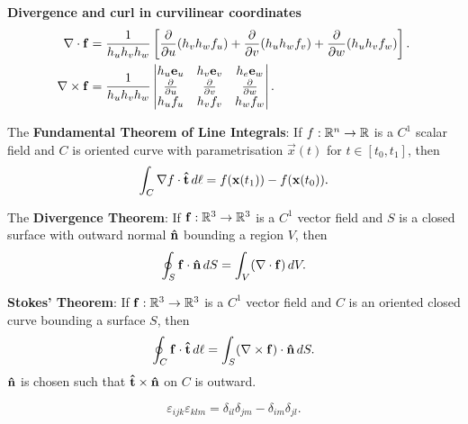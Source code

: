\documentclass[10pt, a4paper]{article}
\begin{document}
\textbf{Divergence and curl in curvilinear coordinates}
\begin{align*}
    \mathbf{\nabla} \cdot \mathbf{f} &= \frac{1}{h_uh_vh_w}\left[\frac{\partial }{\partial u}(h_vh_wf_u) + \frac{\partial }{\partial v}(h_uh_wf_v) + \frac{\partial }{\partial w}(h_uh_vf_w)\right]. \\
    \mathbf{\nabla} \times \mathbf{f} &= \frac{1}{h_uh_vh_w}\begin{vmatrix}
        h_u\mathbf{e}_u & h_v\mathbf{e}_v & h_e\mathbf{e}_w \\
        \frac{\partial }{\partial u} & \frac{\partial }{\partial v} & \frac{\partial }{\partial w} \\
        h_uf_u & h_vf_v & h_wf_w
    \end{vmatrix}.
\end{align*}

The \textbf{Fundamental Theorem of Line Integrals}:
If $f : \mathbb{R} ^ n \to \mathbb{R}$ is a $C ^ 1$ scalar field and $C$ is oriented curve with parametrisation $\vec{x}(t)$ for $t \in [t_0, t_1]$,
then
\[
\int_{C}\mathbf{\nabla} f\cdot\mathbf{\hat{t}}\,d\ell = f(\mathbf{x}(t_1)) - f(\mathbf{x}(t_0)).
\]

The \textbf{Divergence Theorem}:
If $\mathbf{f} : \mathbb{R} ^ 3 \to \mathbb{R} ^ 3$ is a $C ^ 1$ vector field and $S$ is a closed surface with outward normal $\mathbf{\hat{n}}$ bounding a region $V$,
then
\[
\oint_{S}\mathbf{f}\cdot\mathbf{\hat{n}}\,dS = \int_{V}(\mathbf{\nabla} \cdot \mathbf{f})\,dV.
\]

\textbf{Stokes' Theorem}:
If $\mathbf{f} : \mathbb{R} ^ 3 \to \mathbb{R} ^ 3$ is a $C ^ 1$ vector field and $C$ is an oriented closed curve bounding a surface $S$,
then
\[
\oint_{C}\mathbf{f}\cdot\mathbf{\hat{t}}\,d\ell = \int_{S}(\mathbf{\nabla} \times \mathbf{f})\cdot\mathbf{\hat{n}}\,dS.
\]
$\mathbf{\hat{n}}$ is chosen such that $\mathbf{\hat{t}} \times \mathbf{\hat{n}}$ on $C$ is outward.

\[
\varepsilon_{ijk}\varepsilon_{klm} = \delta_{il}\delta_{jm} - \delta_{im}\delta_{jl}.
\]
\end{document}
